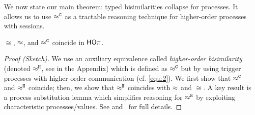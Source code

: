 \noi We now state our main theorem: typed bisimilarities collapse for \HOp processes. 
It allows us to use $\approx^\mathtt{C}$ as a tractable reasoning %
technique for higher-order processes with sessions.


\begin{theorem}[Coincidence]\rm
	\label{the:coincidence}
$\cong$, $\approx$,  and $\approx^\mathtt{C}$ coincide in $\mathsf{HO}\pi$. 
\end{theorem}

\begin{proof}[Proof (Sketch)]
We use an auxiliary equivalence called \emph{higher-order bisimilarity} (denoted $\approx^\mathtt{H}$, see  in the Appendix) which 
is defined as $\approx^\mathtt{C}$ but by
using  trigger processes with higher-order communication (cf. \eqref{equ:2}).
We first show that $\approx^\mathtt{C}$ and $\approx^\mathtt{H}$ coincide; then, we show that $\approx^\mathtt{H}$ coincides with $\approx$ and $\cong$.
A key result is a process substitution lemma which simplifies reasoning 
for $\approx^\mathtt{H}$
by exploiting characteristic processes/values.
See
and~\cite{KouzapasPY15} for full details.
\end{proof}






